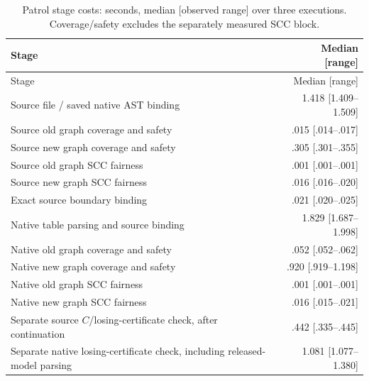 \begin{center}\small
\begin{longtable}{@{}L{105mm}r@{}}
\caption{Patrol stage costs: seconds, median [observed range] over three
executions. Coverage/safety excludes the separately measured SCC block.}
\label{tab:supp-patrol-stage-costs}\\
\toprule Stage & Median [range]\\\midrule
\endfirsthead
\toprule Stage & Median [range]\\\midrule
\endhead
Source file / saved native AST binding & 1.418 [1.409--1.509]\\
Source old graph coverage and safety & .015 [.014--.017]\\
Source new graph coverage and safety & .305 [.301--.355]\\
Source old graph SCC fairness & .001 [.001--.001]\\
Source new graph SCC fairness & .016 [.016--.020]\\
Exact source boundary binding & .021 [.020--.025]\\
Native table parsing and source binding & 1.829 [1.687--1.998]\\
Native old graph coverage and safety & .052 [.052--.062]\\
Native new graph coverage and safety & .920 [.919--1.198]\\
Native old graph SCC fairness & .001 [.001--.001]\\
Native new graph SCC fairness & .016 [.015--.021]\\\midrule
Separate source $C$/losing-certificate check, after continuation & .442 [.335--.445]\\
Separate native losing-certificate check, including released-model parsing & 1.081 [1.077--1.380]\\\bottomrule
\end{longtable}
\end{center}

